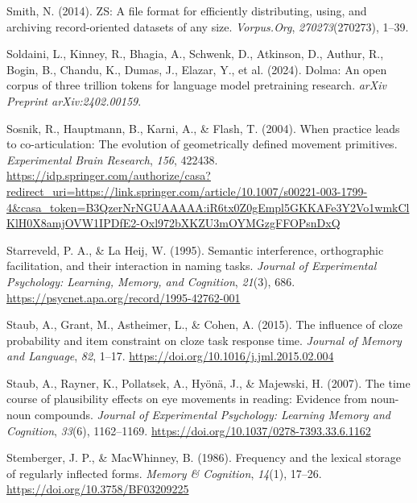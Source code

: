 \documentclass[
  12pt,
  letterpaper,
]{scrreprt}
\newlength{\cslhangindent}
\newenvironment{CSLReferences}[2] %
 {\begin{list}{}{%
  \setlength{\itemindent}{0pt}
  \setlength{\leftmargin}{0pt}
  \setlength{\parsep}{0pt}
  \ifodd #1
   \setlength{\leftmargin}{\cslhangindent}
   \setlength{\itemindent}{-1\cslhangindent}
  \fi
  \setlength{\itemsep}{#2\baselineskip}}}
 {\end{list}}
\begin{document}
\begin{CSLReferences}{1}{0}
Smith, N. (2014). ZS: A file format for efficiently distributing, using,
and archiving record-oriented datasets of any size. \emph{Vorpus.Org},
\emph{270273}(270273), 1--39.

Soldaini, L., Kinney, R., Bhagia, A., Schwenk, D., Atkinson, D., Authur,
R., Bogin, B., Chandu, K., Dumas, J., Elazar, Y., et al. (2024). Dolma:
An open corpus of three trillion tokens for language model pretraining
research. \emph{arXiv Preprint arXiv:2402.00159}.

Sosnik, R., Hauptmann, B., Karni, A., \& Flash, T. (2004). When practice
leads to co-articulation: The evolution of geometrically defined
movement primitives. \emph{Experimental Brain Research}, \emph{156},
422438.
\url{https://idp.springer.com/authorize/casa?redirect_uri=https://link.springer.com/article/10.1007/s00221-003-1799-4&casa_token=B3QzerNrNGUAAAAA:iR6tx0Z0gEmpl5GKKAFe3Y2Vo1wmkClKlH0X8amjOVW1IPDfE2-Oxl972bXKZU3mOYMGzgFFOPsnDxQ}

Starreveld, P. A., \& La Heij, W. (1995). Semantic interference,
orthographic facilitation, and their interaction in naming tasks.
\emph{Journal of Experimental Psychology: Learning, Memory, and
Cognition}, \emph{21}(3), 686.
\url{https://psycnet.apa.org/record/1995-42762-001}

Staub, A., Grant, M., Astheimer, L., \& Cohen, A. (2015). The influence
of cloze probability and item constraint on cloze task response time.
\emph{Journal of Memory and Language}, \emph{82}, 1--17.
\url{https://doi.org/10.1016/j.jml.2015.02.004}

Staub, A., Rayner, K., Pollatsek, A., Hyönä, J., \& Majewski, H. (2007).
The time course of plausibility effects on eye movements in reading:
Evidence from noun-noun compounds. \emph{Journal of Experimental
Psychology: Learning Memory and Cognition}, \emph{33}(6), 1162--1169.
\url{https://doi.org/10.1037/0278-7393.33.6.1162}

Stemberger, J. P., \& MacWhinney, B. (1986). Frequency and the lexical
storage of regularly inflected forms. \emph{Memory \& Cognition},
\emph{14}(1), 17--26. \url{https://doi.org/10.3758/BF03209225}


\end{CSLReferences}
\end{document}
